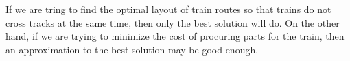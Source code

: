 
If we are tring to find the optimal layout of train routes so that trains do
not cross tracks at the same time, then only the best solution will do. On the
other hand, if we are trying to minimize the cost of procuring parts for the 
train, then an approximation to the best solution may be good enough.
